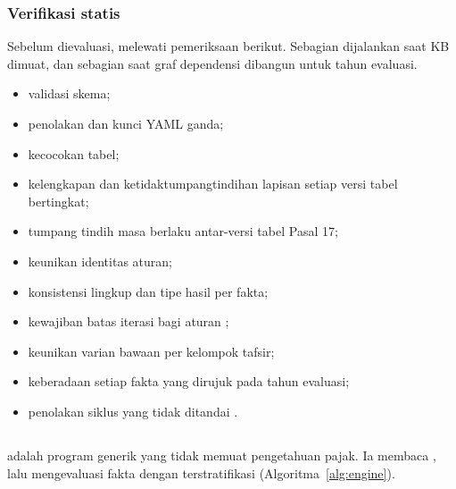 \subsubsection{Verifikasi statis}
Sebelum dievaluasi,  melewati pemeriksaan berikut. Sebagian dijalankan saat KB dimuat, dan sebagian saat graf dependensi dibangun untuk tahun evaluasi.
\begin{itemize}[leftmargin=*,nosep]
  \item validasi skema;
  \item penolakan  dan kunci YAML ganda;
  \item kecocokan  tabel;
  \item kelengkapan dan ketidaktumpangtindihan lapisan setiap versi tabel bertingkat;
  \item tumpang tindih masa berlaku antar-versi tabel Pasal 17;
  \item keunikan identitas aturan;
  \item konsistensi lingkup dan tipe hasil per fakta;
  \item kewajiban batas iterasi bagi aturan ;
  \item keunikan varian bawaan per kelompok tafsir;
  \item keberadaan setiap fakta yang dirujuk pada tahun evaluasi;
  \item penolakan siklus yang tidak ditandai .
\end{itemize}

\subsection{}
\label{subsec:engine}

 adalah program generik yang tidak memuat pengetahuan pajak. Ia membaca , lalu mengevaluasi fakta dengan  terstratifikasi (Algoritma~\ref{alg:engine}).


